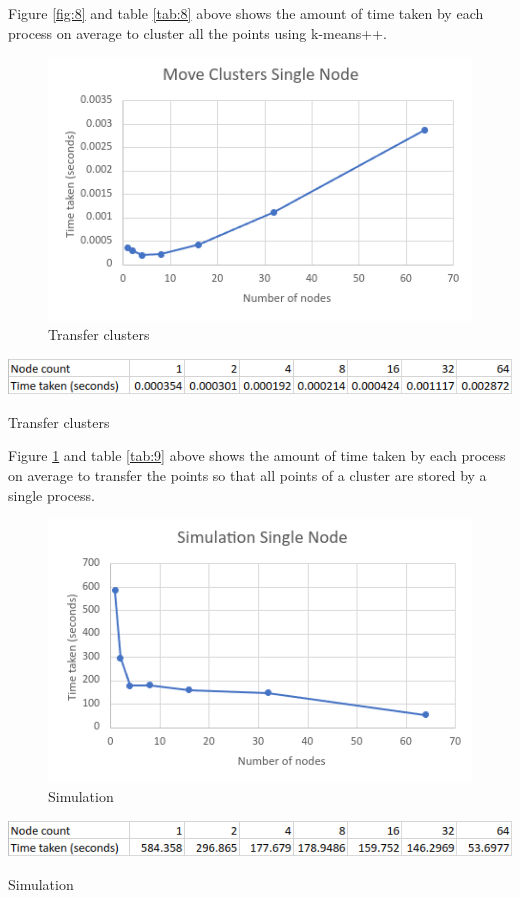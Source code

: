 \documentclass{article}
\begin{document}
Figure \ref{fig:8} and table \ref{tab:8} above shows the amount of time taken by each process on
average to cluster all the points using k-means++.

\clearpage
\begin{figure}[!htb]
\includegraphics[width=\textwidth]{single-node/move-clusters.png}
\caption{Transfer clusters}
\label{fig:9}
\end{figure}
\begin{table}[!htb]
\includegraphics[width=\textwidth]{single-node/move-clusters-table.png}
\caption{Transfer clusters}
\label{tab:9}
\end{table}

Figure \ref{fig:9} and table \ref{tab:9} above shows the amount of time taken by each process on
average to transfer the points so that all points of a cluster are stored by a single process.

\clearpage
\begin{figure}[!htb]
\includegraphics[width=\textwidth]{single-node/simulation.png}
\caption{Simulation}
\label{fig:10}
\end{figure}
\begin{table}[!htb]
\includegraphics[width=\textwidth]{single-node/simulation-table.png}
\caption{Simulation}
\label{tab:10}
\end{table}
\end{document}
